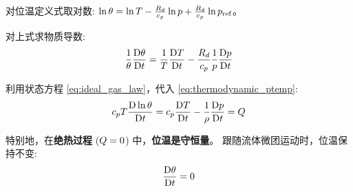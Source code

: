 \begin{proofbox}
    对位温定义式取对数: $\ln\theta = \ln T - \frac{R_d}{c_p} \ln p + \frac{R_d}{c_p} \ln p_\text{ref}$。

    对上式求物质导数:
    \begin{equation*}
        \frac{1}{\theta} \frac{\mathrm{D} \theta}{\mathrm{D} t} = \frac{1}{T} \frac{\mathrm{D} T}{\mathrm{D} t} - \frac{R_d}{c_p} \frac{1}{p} \frac{\mathrm{D} p}{\mathrm{D} t}
    \end{equation*}

    利用状态方程 \eqref{eq:ideal_gas_law}，代入 \eqref{eq:thermodynamic_ptemp}:
    \begin{equation*}
        c_p T \frac{\mathrm{D} \ln\theta}{\mathrm{D} t} = c_p \frac{\mathrm{D} T}{\mathrm{D} t} - \frac{1}{\rho} \frac{\mathrm{D} p}{\mathrm{D} t} = Q
    \end{equation*}
\end{proofbox}

特别地，在\textbf{绝热过程} ($Q = 0$) 中，\textbf{位温是守恒量}。
跟随流体微团运动时，位温保持不变:
\begin{equation}
    \frac{\mathrm{D} \theta}{\mathrm{D} t} = 0
    \label{eq:adiabatic_ptemp}
\end{equation}
